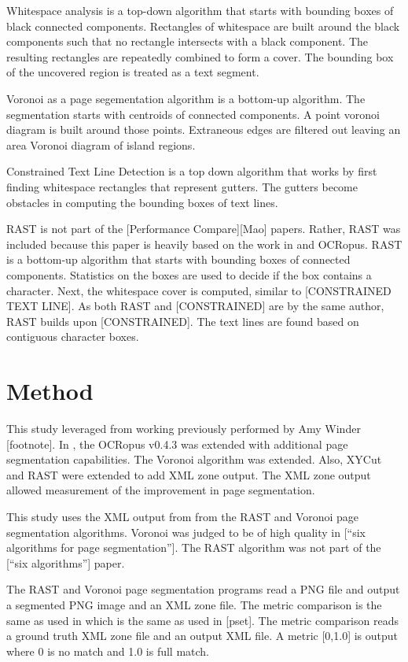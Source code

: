 \documentclass[conference]{IEEEtran}
\begin{document}
Whitespace analysis is a top-down algorithm that starts with bounding boxes of
black connected components. Rectangles of whitespace are built around the black
components such that no rectangle intersects with a black component. The
resulting rectangles are repeatedly combined to form a cover. The bounding box
of the uncovered region is treated as a text segment. 

Voronoi as a page segementation algorithm is a bottom-up algorithm. The
segmentation starts with centroids of connected components. A point voronoi
diagram is built around those points. Extraneous edges are filtered out leaving
an area Voronoi diagram of island regions.

Constrained Text Line Detection is a top down algorithm that works by first
finding whitespace rectangles that represent gutters. The gutters become
obstacles in computing the bounding boxes of text lines.

RAST is not part of the [Performance Compare][Mao] papers. Rather, RAST was
included because this paper is heavily based on the work in
\cite{IEEEhowto:Winder} and OCRopus. RAST is a bottom-up algorithm that starts
with bounding boxes of connected components. Statistics on the boxes are used
to decide if the box contains a character. Next, the whitespace cover is
computed, similar to [CONSTRAINED TEXT LINE]. As both RAST and [CONSTRAINED]
are by the same author, RAST builds upon [CONSTRAINED]. The text lines are
found based on contiguous character boxes.


%
%
\section{Method}
This study leveraged from working previously performed by Amy Winder
[footnote]. In \cite{IEEEhowto:Winder}, the OCRopus v0.4.3 was extended with
additional page segmentation capabilities. The Voronoi algorithm was extended.
Also, XYCut and RAST were extended to add XML zone output. The XML zone output
allowed measurement of the improvement in page segmentation.

This study uses the XML output from \cite{IEEEhowto:Winder} from the RAST and
Voronoi page segmentation algorithms. Voronoi was judged to be of high quality
in [“six algorithms for page segmentation”]. The RAST algorithm was not part of
the [“six algorithms”] paper. 

The RAST and Voronoi page segmentation programs read a PNG file and output a
segmented PNG image and an XML zone file. The metric comparison is the same as
used in \cite{IEEEhowto:Winder} which is the same as used in [pset]. The metric comparison
reads a ground truth XML zone file and an output XML file. A metric [0,1.0] is
output where 0 is no match and 1.0 is full match. 
\end{document}
